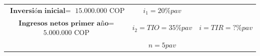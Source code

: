 \begin{center}
\begin{longtable}{|c|c|c|}
        $\textbf{Inversión inicial} = $ $15\text{.}000\text{.}000 \text{ COP}$       & $i_{1} = 20\% pav$                                                          &                                                                  \\
        $\textbf{Ingresos netos primer año} =$ $5\text{.}000\text{.}000 \text{ COP}$ & $i_{2} = TIO = 35\% pav$                                                    & $i = TIR = ?\% pav$                                              \\
                                                                                     & $n = 5 pav$                                                                 &                                                                  \\


\end{longtable}
\end{center}
